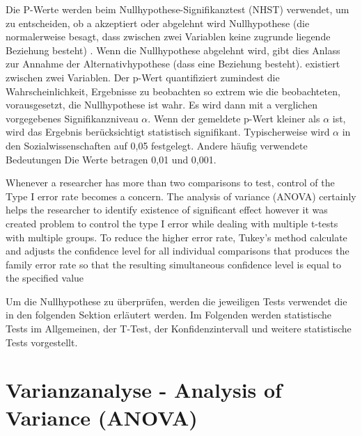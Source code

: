 Die P-Werte werden beim Nullhypothese-Signifikanztest (NHST) verwendet, um zu entscheiden, ob a akzeptiert oder abgelehnt wird
Nullhypothese (die normalerweise besagt, dass zwischen zwei Variablen keine zugrunde liegende Beziehung besteht) \cite{Vidgen_2016}.
Wenn die Nullhypothese abgelehnt wird, gibt dies Anlass zur Annahme der Alternativhypothese (dass eine Beziehung besteht).
existiert zwischen zwei Variablen. Der p-Wert quantifiziert zumindest die Wahrscheinlichkeit, Ergebnisse zu beobachten
so extrem wie die beobachteten, vorausgesetzt, die Nullhypothese ist wahr. Es wird dann mit a verglichen
vorgegebenes Signifikanzniveau  $\alpha$. Wenn der gemeldete p-Wert kleiner als $\alpha$ ist, wird das Ergebnis berücksichtigt
statistisch signifikant. Typischerweise wird $\alpha$ in den Sozialwissenschaften auf 0,05 festgelegt. Andere häufig verwendete Bedeutungen
Die Werte betragen 0,01 und 0,001.

Whenever a researcher has more than two comparisons to test,
control of the Type I error rate becomes a concern. The
analysis of variance (ANOVA) certainly helps the researcher
to identify existence of significant effect however it was
created problem to control the type I error while dealing with
multiple t-tests with multiple groups.
To reduce
the higher error rate, Tukey's method calculate and adjusts the
confidence level for all individual comparisons that produces
the family error rate so that the resulting simultaneous
confidence level is equal to the specified value

Um die Nullhypothese zu überprüfen, werden die jeweiligen Tests verwendet die in den folgenden Sektion erläutert werden. 
Im Folgenden werden statistische Tests im
Allgemeinen, der T-Test, der Konfidenzintervall und weitere statistische Tests
vorgestellt.

\section{Varianzanalyse - Analysis of Variance (ANOVA)}
 
